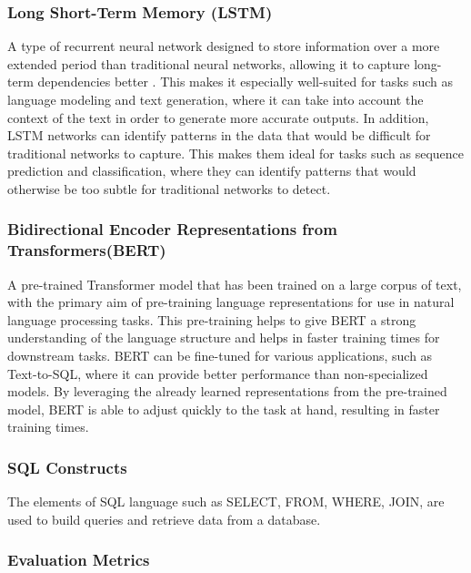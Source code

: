 \subsubsection{Long Short-Term Memory (LSTM)}

A type of recurrent neural network designed to store information over a more extended period than traditional neural networks, allowing it to capture long-term dependencies better \cite{Hochreiter1997LongSM}.
This makes it especially well-suited for tasks such as language modeling and text generation, where it can take into account the context of the text in order to generate more accurate outputs.
In addition, LSTM networks can identify patterns in the data that would be difficult for traditional networks to capture. This makes them ideal for tasks such as sequence prediction and classification, where they can identify patterns that would otherwise be too subtle for traditional networks to detect.

\subsubsection{Bidirectional Encoder Representations from Transformers(BERT)}

A pre-trained Transformer model that has been trained on a large corpus of text, with the primary aim of pre-training language representations for use in natural language processing tasks\cite{devlin-etal-2019-bert}. This pre-training helps to give BERT a strong understanding of the language structure and helps in faster training times for downstream tasks. BERT can be fine-tuned for various applications, such as Text-to-SQL, where it can provide better performance than non-specialized models. By leveraging the already learned representations from the pre-trained model, BERT is able to adjust quickly to the task at hand, resulting in faster training times.

\subsubsection{SQL Constructs}

The elements of SQL language such as SELECT, FROM, WHERE, JOIN, are used to build queries and retrieve data from a database.

\subsubsection{Evaluation Metrics}

